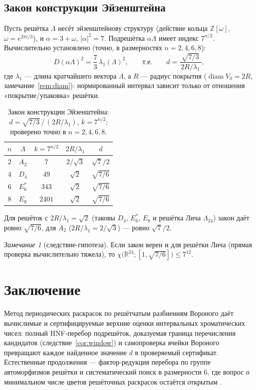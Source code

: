 \documentclass[12pt]{article}
\theoremstyle{plain}
\theoremstyle{definition}
\theoremstyle{remark}
\newtheorem{remark}{Замечание}
\newcommand{\RR}{\mathbb{R}}
\newcommand{\ZZ}{\mathbb{Z}}
\DeclareMathOperator{\diam}{diam}
\begin{document}
\subsection{Закон конструкции Эйзенштейна}

Пусть решётка $\Lambda$ несёт эйзенштейнову структуру (действие кольца
$\ZZ[\omega]$, $\omega=e^{2\pi i/3}$), и $\alpha=3+\omega$, $|\alpha|^2=7$.
Подрешётка $\alpha\Lambda$ имеет индекс $7^{n/2}$. Вычислительно установлено
(точно, в размерностях $n=2,4,6,8$):
\[
D(\alpha\Lambda)^2=\frac{7}{3}\,\lambda_1(\Lambda)^2,
\qquad\text{т.е.}\qquad
d=\frac{\sqrt{7/3}}{\,2R/\lambda_1\,},
\]
где $\lambda_1$ --- длина кратчайшего вектора $\Lambda$, а $R$ --- радиус
покрытия ($\diam V_0=2R$, замечание~\ref{rem:diam}): нормированный интервал
зависит только от отношения «покрытие/упаковка» решётки.

\begin{table}[h!]
\centering
\caption{Закон конструкции Эйзенштейна:
$d=\sqrt{7/3}\,/\,(2R/\lambda_1)$, $k=7^{n/2}$;
проверено точно в $n=2,4,6,8$.}
\label{tab:law}
\medskip
\begin{tabular}{ccccc}
\hline
$n$ & $\Lambda$ & $k=7^{n/2}$ & $2R/\lambda_1$ & $d$\\
\hline
$2$ & $A_2$     & $7$    & $2/\sqrt{3}$ & $\sqrt{7}/2$\\
$4$ & $D_4$     & $49$   & $\sqrt{2}$   & $\sqrt{7/6}$\\
$6$ & $E_6^{*}$ & $343$  & $\sqrt{2}$   & $\sqrt{7/6}$\\
$8$ & $E_8$     & $2401$ & $\sqrt{2}$   & $\sqrt{7/6}$\\
\hline
\end{tabular}
\end{table}

Для решёток с $2R/\lambda_1=\sqrt{2}$ (таковы $D_4$, $E_6^{*}$, $E_8$ и
решётка Лича $\Lambda_{24}$) закон даёт ровно $\sqrt{7/6}$, для $A_2$
($2R/\lambda_1=2/\sqrt{3}$) --- ровно $\sqrt{7}/2$.

\begin{remark}[следствие-гипотеза]
Если закон верен и для решётки Лича (прямая проверка вычислительно тяжела),
то $\chi\bigl(\RR^{24};[1,\sqrt{7/6}]\bigr)\le 7^{12}$.
\end{remark}

\section{Заключение}

Метод периодических раскрасок по решётчатым разбиениям Вороного даёт
вычислимые и сертифицируемые верхние оценки интервальных хроматических чисел:
полный HNF-перебор подрешёток, доказуемая граница перечисления кандидатов
(следствие~\ref{cor:window}) и самопроверка ячейки Вороного превращают каждое
найденное значение $d$ в проверяемый сертификат. Естественные продолжения ---
фактор-редукция перебора по группе автоморфизмов решётки и систематический
поиск в размерности $6$, где вопрос о минимальном числе цветов решёточных
раскрасок остаётся открытым \cite{Arman2021}.
\end{document}
